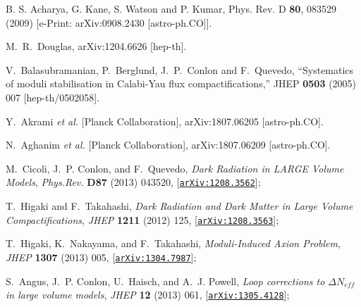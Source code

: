 \documentclass[12pt]{article}
\numberwithin{equation}{section}
\begin{document}
\begin{thebibliography}{99}
  
 
B. S. Acharya, G. Kane, S. Watson and P. Kumar, Phys. Rev. D {\bf 80}, 083529 (2009)
 [e-Print: arXiv:0908.2430 [astro-ph.CO]].  
  
   
  M.~R.~Douglas,
  arXiv:1204.6626 [hep-th].
  
  
  V.~Balasubramanian, P.~Berglund, J.~P.~Conlon and F.~Quevedo,
  ``Systematics of moduli stabilisation in Calabi-Yau flux compactifications,''
  JHEP {\bf 0503} (2005) 007
  [hep-th/0502058].
  

  Y.~Akrami {\it et al.} [Planck Collaboration],
  arXiv:1807.06205 [astro-ph.CO].

  N.~Aghanim {\it et al.} [Planck Collaboration],
  arXiv:1807.06209 [astro-ph.CO].
  
  

M.~Cicoli, J.~P. Conlon, and F.~Quevedo, {\it {Dark Radiation in LARGE Volume
  Models}},  {\em Phys.Rev.} {\bf D87} (2013) 043520,
  [\href{http://arxiv.org/abs/1208.3562}{{\tt arXiv:1208.3562}}];

T.~Higaki and F.~Takahashi, {\it {Dark Radiation and Dark Matter in Large
  Volume Compactifications}},  {\em JHEP} {\bf 1211} (2012) 125,
  [\href{http://arxiv.org/abs/1208.3563}{{\tt arXiv:1208.3563}}];

T.~Higaki, K.~Nakayama, and F.~Takahashi, {\it {Moduli-Induced Axion Problem}},
   {\em JHEP} {\bf 1307} (2013) 005,
  [\href{http://arxiv.org/abs/1304.7987}{{\tt arXiv:1304.7987}}];


S.~Angus, J.~P. Conlon, U.~Haisch, and A.~J. Powell, {\it {Loop corrections to
  $\Delta N_{eff}$ in large volume models}},  {\em JHEP} {\bf 12} (2013) 061,
  [\href{http://arxiv.org/abs/1305.4128}{{\tt arXiv:1305.4128}}];



\end{thebibliography}
\end{document}
